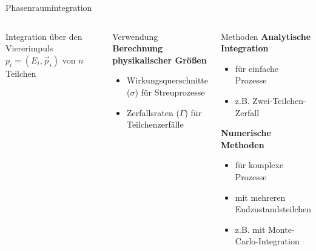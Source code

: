 \documentclass[aspectratio=169,xcolor=dvipsnames]{beamer}
\begin{document}
\begin{frame}{Phasenraumintegration}
    \begin{columns}[c]
        Integration über den Viererimpuls $p_i = (E_i, \overrightarrow{p}_i)$ von $n$ Teilchen
        \vspace{10pt}
        \begin{block}{Verwendung}
            \textbf{Berechnung physikalischer Größen}
            \begin{itemize}
                \item Wirkungsquerschnitte (\( \sigma \)) für Streuprozesse
                \item Zerfallsraten (\( \Gamma \)) für Teilchenzerfälle
            \end{itemize}
        \end{block}
        \begin{exampleblock}{Methoden}
            \textbf{Analytische Integration}
            \begin{itemize}
                \item für einfache Prozesse
                \item z.B. Zwei-Teilchen-Zerfall
            \end{itemize}
            \vspace{10pt}
            \textbf{Numerische Methoden}
            \begin{itemize}
                \item für komplexe Prozesse
                \item mit mehreren Endzustandsteilchen
                \item z.B. mit Monte-Carlo-Integration
            \end{itemize}
        \end{exampleblock}
    \end{columns}
\end{frame}
\end{document}
